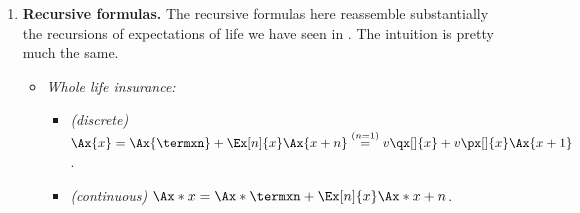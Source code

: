 \begin{enumerate}
\begin{enumerate}[label={(\arabic*)}]
\(Z_{\mathrm{deferred}}\) denote the PVRV's for whole life insurance,
\(n\)-year term life insurance, and \(n\)-year deferred whole life insurance
respectively. Then, we have
\(Z_{\mathrm{WL}}=Z_{\mathrm{term}}+Z_{\mathrm{deferred}}\), thus
\begin{align*}
\vari{Z_{\mathrm{WL}}}&=\vari{Z_{\mathrm{term}}}+\vari{Z_{\mathrm{deferred}}}+2\cov{Z_{\mathrm{term}}}{Z_{\mathrm{deferred}}} \\
&=\begin{cases}
\vari{Z_{\mathrm{term}}}+\vari{Z_{\mathrm{deferred}}}-2\Ax{\termxn}\times \Ax[n|]{x}&
\text{for discrete case}, \\
\vari{Z_{\mathrm{term}}}+\vari{Z_{\mathrm{deferred}}}-2\Ax*{\termxn}\times \Ax*[n|]{x}&
\text{for continuous case}.
\end{cases}
\end{align*}
If the variances \(\vari{Z_{\mathrm{WL}}}\) and \(\vari{Z_{\mathrm{term}}}\)
are known, we can then deduce the desired variance \(\vari{Z_{\mathrm{deferred}}}\).
\end{enumerate}
\item \label{it:insurance-recursions} \textbf{Recursive formulas.} The
recursive formulas here reassemble substantially the recursions of expectations
of life we have seen in . The intuition is pretty
much the same.
\begin{itemize}
\item \emph{Whole life insurance:}
\begin{itemize}
\item \emph{(discrete)} \(\Ax{x}=\Ax{\termxn}+\Ex[n]{x}\Ax{x+n}\overset{(n=1)}{=}v\qx[]{x}+v\px[]{x}\Ax{x+1}\).
\item \emph{(continuous)} \(\Ax*{x}=\Ax*{\termxn}+\Ex[n]{x}\Ax*{x+n}\).
\end{itemize}
\begin{center}
\end{center}
\end{itemize}
\end{enumerate}
